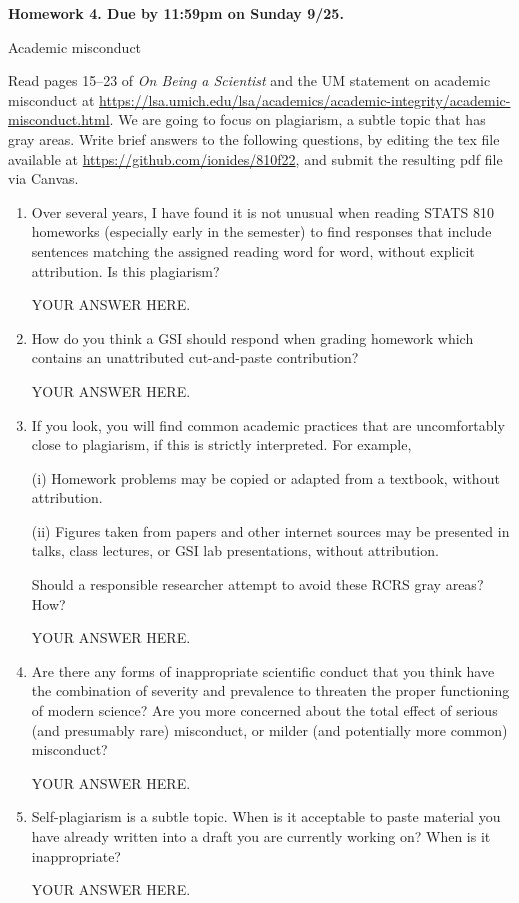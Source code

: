 \documentclass[12pt]{article}
\begin{document}
\begin{center}\bf
Homework 4. Due by 11:59pm on Sunday 9/25.

Academic misconduct

\end{center}
Read pages 15--23 of {\em On Being a Scientist} and the UM statement on academic misconduct at \url{https://lsa.umich.edu/lsa/academics/academic-integrity/academic-misconduct.html}. We are going to focus on plagiarism, a subtle topic that has gray areas. Write brief answers to the following questions, by editing the tex file available at \url{https://github.com/ionides/810f22}, and submit the resulting pdf file via Canvas. 

\begin{enumerate}

\item Over several years, I have found it is not unusual when reading STATS 810 homeworks (especially early in the semester) to find responses that include sentences matching the assigned reading word for word, without explicit attribution. Is this plagiarism?

YOUR ANSWER HERE.

\item How do you think a GSI should respond when grading homework which contains an unattributed cut-and-paste contribution?

YOUR ANSWER HERE.

\item If you look, you will find common academic practices that are uncomfortably close to plagiarism, if this is strictly interpreted. For example,

(i) Homework problems may be copied or adapted from a textbook, without attribution.

(ii) Figures taken from papers and other internet sources may be presented in talks, class lectures, or GSI lab presentations, without attribution.

Should a responsible researcher attempt to avoid these RCRS gray areas? How?
  

YOUR ANSWER HERE.

\item Are there any forms of inappropriate scientific conduct that you think have the combination of severity and prevalence to threaten the proper functioning of modern science? Are you more concerned about the total effect of serious (and presumably rare) misconduct, or milder (and potentially more common) misconduct?

YOUR ANSWER HERE.

\item Self-plagiarism is a subtle topic. When is it acceptable to paste material you have already written into a draft you are currently working on? When is it inappropriate?

YOUR ANSWER HERE.

\end{enumerate}
\end{document}
